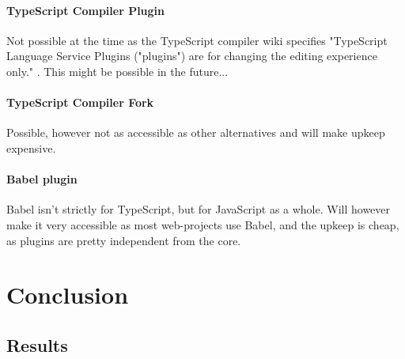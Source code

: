 \documentclass[UKenglish]{ifimaster}  %
\begin{document}
\subsection{TypeScript Compiler Plugin}

Not possible at the time as the TypeScript compiler wiki specifies "TypeScript Language Service Plugins ("plugins") are for changing the editing experience only." \cite{tscplugin}. This might be possible in the future...

\subsection{TypeScript Compiler Fork}

Possible, however not as accessible as other alternatives and will make upkeep expensive.

\subsection{Babel plugin}

Babel isn't strictly for TypeScript, but for JavaScript as a whole. Will however make it very accessible as most web-projects use Babel, and the upkeep is cheap, as plugins are pretty independent from the core.

\part{Conclusion}                     %

\chapter{Results}                     %


\backmatter{}
\printbibliography
\end{document}
